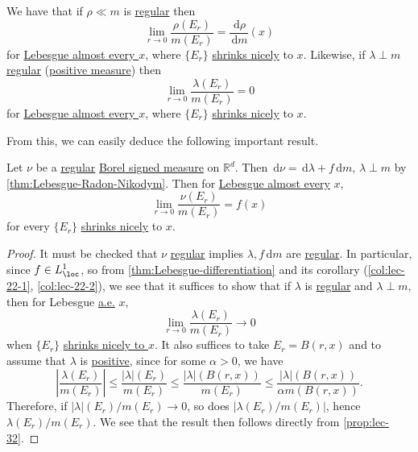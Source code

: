 \begin{prev}
	We have that if \(\rho \ll m\) is \hyperref[def:regular]{regular} then
	\[
		\lim_{r \to 0} \frac{\rho(E_r)}{m(E_r)} = \frac{\,\mathrm{d}\rho}{\,\mathrm{d}m}(x)
	\]
	for \hyperref[def:mu-almost-everywhere]{Lebesgue almost every \(x\)}, where \(\{E_r\}\) \hyperref[def:shrink-nicely]{shrinks nicely} to \(x\).
	Likewise, if \(\lambda \perp m\) \hyperref[def:regular]{regular} (\hyperref[def:signed-measure]{positive measure}) then
	\[
		\lim_{r \to 0} \frac{\lambda(E_r)}{m(E_r)} = 0
	\]
	for \hyperref[def:mu-almost-everywhere]{Lebesgue almost every \(x\)}, where \(\{E_r\}\) \hyperref[def:shrink-nicely]{shrinks nicely} to \(x\).
\end{prev}

From this, we can easily deduce the following important result.
\begin{theorem}\label{thm:Lebesgue-differentiation-for-regular-measure}
	Let \(\nu\) be a \hyperref[def:regular]{regular}  \hyperref[def:signed-measure]{\hyperref[def:Borel-measure]{Borel} signed measure} on \(\mathbb{R} ^d\).
	Then \(\,\mathrm{d}\nu = \,\mathrm{d}\lambda + f \,\mathrm{d}m\), \(\lambda \perp m\) by \autoref{thm:Lebesgue-Radon-Nikodym}.
	Then for \hyperref[def:mu-almost-everywhere]{Lebesgue almost every} \(x\),
	\[
		\lim_{r \to 0} \frac{\nu(E_r)}{m(E_r)} = f(x)
	\]
	for every \(\{E_r\}\) \hyperref[def:shrink-nicely]{shrinks nicely} to \(x\).
\end{theorem}
\begin{proof}
	It must be checked that \(\nu\) \hyperref[def:regular]{regular} implies \(\lambda, f \,\mathrm{d}m\) are \hyperref[def:regular]{regular}.
	In particular, since \(f\in L^1_{\loc } \), so from \autoref{thm:Lebesgue-differentiation} and its corollary (\autoref{col:lec-22-1}, \autoref{col:lec-22-2}),
	we see that it suffices to show that if \(\lambda \) is \hyperref[def:regular]{regular} and \(\lambda \perp m\),
	then for Lebesgue \hyperref[def:mu-almost-everywhere]{a.e.} \(x\),
	\[
		\lim_{r \to 0} \frac{\lambda (E_{r} )}{m(E_{r} )}\to 0
	\]
	when \(\{E_{r} \}\) \hyperref[def:shrink-nicely]{shrinks nicely to \(x\)}. It also suffices to take \(E_{r} = B(r, x)\) and to assume that \(\lambda \) is
	\hyperref[def:signed-measure]{positive}, since for some \(\alpha >0\), we have
	\[
		\left\vert \frac{\lambda (E_{r} )}{m(E_{r} )} \right\vert
		\leq \frac{\left\vert \lambda \right\vert(E_{r} ) }{m(E_{r} )}
		\leq \frac{\left\vert \lambda \right\vert(B(r, x)) }{m(E_{r} )}
		\leq \frac{\left\vert \lambda \right\vert(B(r, x)) }{\alpha m(B(r, x))}.
	\]
	Therefore, if \(\left\vert \lambda \right\vert(E_{r} ) / m(E_{r} ) \to 0\), so does \(\left\vert \lambda (E_{r} ) / m(E_{r} ) \right\vert \),
	hence \(\lambda (E_{r} ) / m(E_{r} )\). We see that the result then follows directly from \autoref{prop:lec-32}.
\end{proof}


